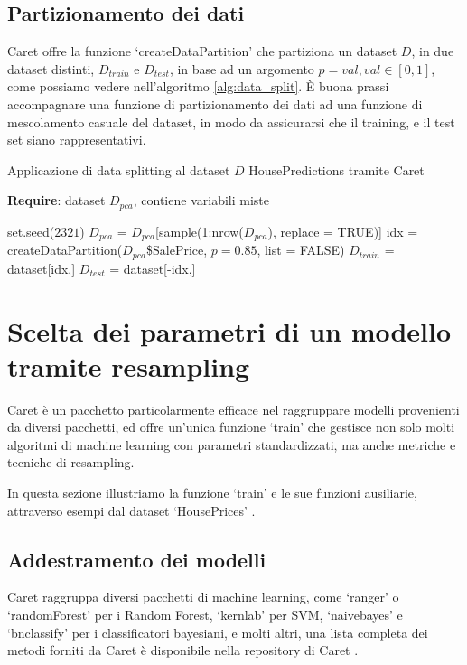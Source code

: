 \documentclass[12pt]{article}
\begin{document}
\subsection{Partizionamento dei dati}

Caret offre la funzione ‘createDataPartition’ che partiziona un dataset $D$, in due dataset distinti, $D_{train}$ e $D_{test}$, in base ad un argomento $p=val, val \in [0,1]$,
 come possiamo vedere nell'algoritmo \ref{alg:data_split}. È buona prassi accompagnare una funzione di partizionamento dei dati ad una funzione di mescolamento casuale del dataset, in 
 modo da assicurarsi che il training, e il test set siano rappresentativi.

\begin{algorithm}[H]
    \caption{Applicazione di data splitting al dataset $D$ HousePredictions tramite Caret}\label{alg:data_split}
    \textbf{Require}: dataset $D_{pca}$, contiene variabili miste
    \begin{algorithmic}[1]
    \State set.seed($2321$)
    \State $D_{pca}$ = $D_{pca}$[sample(1:nrow($D_{pca}$), replace = TRUE)]
    \State idx = createDataPartition($D_{pca}$\$SalePrice, $p=0.85$, list = FALSE)
    \State $D_{train}$ = dataset[idx,]
    \State $D_{test}$ = dataset[-idx,]
    \end{algorithmic}
\end{algorithm}

\section{Scelta dei parametri di un modello tramite resampling}
\label{sec:train}
Caret è un pacchetto particolarmente efficace nel raggruppare modelli provenienti da diversi pacchetti, ed offre un'unica funzione ‘train’ che gestisce non solo molti algoritmi di machine learning con parametri standardizzati, 
ma anche metriche e tecniche di resampling.

In questa sezione illustriamo la funzione ‘train’ e le sue funzioni ausiliarie, attraverso esempi dal dataset ‘HousePrices’ \cite{cit:houseprices}.

\subsection{Addestramento dei modelli}
Caret raggruppa diversi pacchetti di machine learning, come ‘ranger’ \cite{cit:ranger} o ‘randomForest’ \cite{cit:randomForest} per i Random Forest, ‘kernlab’ \cite{cit:kernlab} per SVM, ‘naivebayes’ e ‘bnclassify’ \cite{cit:bnclassify} per i classificatori bayesiani, e molti altri, 
una lista completa dei metodi forniti da Caret è disponibile nella repository di Caret \cite{caret:repo}.
\end{document}
